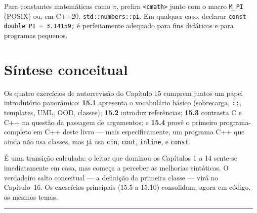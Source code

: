 \documentclass[11pt,a4paper]{article}
\begin{document}
\begin{boaprat}
Para constantes matem\'aticas como $\pi$, prefira \texttt{<cmath>} junto com o macro \texttt{M\_PI} (POSIX) ou, em C++20, \texttt{std::numbers::pi}. Em qualquer caso, declarar \texttt{const double PI = 3.14159;} \'e perfeitamente adequado para fins did\'aticos e para programas pequenos.
\end{boaprat}

\section*{S\'intese conceitual}

Os quatro exerc\'icios de autorrevisão do Cap\'itulo 15 cumprem juntos um papel introdut\'orio panor\^amico: \textbf{15.1} apresenta o vocabul\'ario b\'asico (sobrecarga, \texttt{::}, templates, UML, OOD, classes); \textbf{15.2} introduz refer\^encias; \textbf{15.3} contrasta C e C++ na quest\~ao da passagem de argumentos; e \textbf{15.4} prov\^e o primeiro programa-completo em C++ deste livro --- mais especificamente, um programa C++ que ainda n\~ao usa classes, mas j\'a usa \texttt{cin}, \texttt{cout}, \texttt{inline}, e \texttt{const}.

\'E uma transi\c{c}\~ao calculada: o leitor que dominou os Cap\'itulos 1 a 14 sente-se imediatamente em casa, mas come\c{c}a a perceber as melhorias sint\'aticas. O verdadeiro salto conceitual --- a defini\c{c}\~ao da primeira classe --- vir\'a no Cap\'itulo~16. Os exerc\'icios principais (15.5 a 15.10) consolidam, agora em c\'odigo, os mesmos temas.

\vspace{1em}
\begin{center}\rule{0.5\textwidth}{0.4pt}\end{center}
\end{document}
